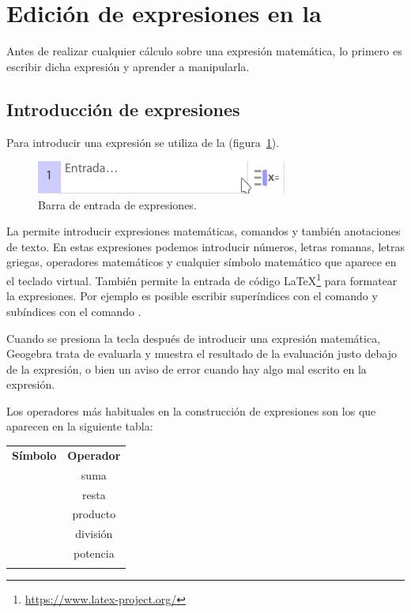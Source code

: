 \section{Edición de expresiones en la }
Antes de realizar cualquier cálculo sobre una expresión matemática, lo primero es escribir dicha expresión y aprender a manipularla.


\subsection*{Introducción de expresiones}
Para introducir una expresión se utiliza  de la  (figura~\ref{g:barra-entrada}).

\begin{figure}[h!]
\begin{center}
\includegraphics[scale=0.6]{img/introduccion/input-bar}
\caption{Barra de entrada de expresiones.} \label{g:barra-entrada}
\end{center}
\end{figure}

La  permite introducir expresiones matemáticas, comandos y también anotaciones de texto.
En estas expresiones podemos introducir números, letras romanas, letras griegas, operadores matemáticos y cualquier símbolo matemático que aparece en el teclado virtual.
También permite la entrada de código \LaTeX\footnote{\url{https://www.latex-project.org/}} para formatear la expresiones.
Por ejemplo es posible escribir superíndices con el comando \command{\^{}} y subíndices con el comando \command{\_}.

Cuando se presiona la tecla  después de introducir una expresión matemática, Geogebra trata de evaluarla y muestra el resultado de la evaluación justo debajo de la expresión, o bien un aviso de error cuando hay algo mal escrito en la expresión.

Los operadores más habituales en la construcción de expresiones son los que aparecen en la siguiente tabla:

\begin{center}
\begin{tabular}{cc}
\tcrule
\textbf{Símbolo} & \textbf{Operador} \\
\command{+}      & suma              \\
\command{-}      & resta             \\
\command{*}      & producto          \\
\command{/}      & división          \\
\command{\^{}}   & potencia          \\
\bcrule
\end{tabular}
\end{center}

